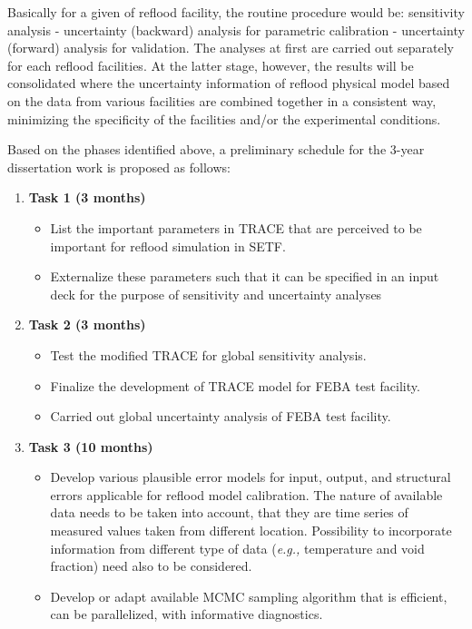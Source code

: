 \documentclass[11pt,titlepage]{article}
\begin{document}
Basically for a given of reflood facility, the routine procedure would be: sensitivity analysis - uncertainty (backward) analysis for parametric calibration - uncertainty (forward) analysis for validation. The analyses at first are carried out separately for each reflood facilities. 
At the latter stage, however, the results will be consolidated where the uncertainty information of reflood physical model based on the data from various facilities are combined together in a consistent way, minimizing the specificity of the facilities and/or the experimental conditions.

Based on the phases identified above, a preliminary schedule for the 3-year dissertation work is proposed as follows:

\begin{enumerate}
    \item \textbf{Task 1 (3 months)}
        \begin{itemize}
            \item List the important parameters in TRACE that are perceived to be important for reflood simulation in SETF.
            \item Externalize these parameters such that it can be specified in an input deck for the purpose of sensitivity and uncertainty analyses 
        \end{itemize}
    \item \textbf{Task 2 (3 months)}
        \begin{itemize}
            \item Test the modified TRACE for global sensitivity analysis.
            \item Finalize the development of TRACE model for FEBA test facility.
            \item Carried out global uncertainty analysis of FEBA test facility.
        \end{itemize}
   \item \textbf{Task 3 (10 months)}
        \begin{itemize}
            \item Develop various plausible error models for input, output, and structural errors applicable for reflood model calibration. 
            The nature of available data needs to be taken into account, that they are time series of measured values taken from different location. 
            Possibility to incorporate information from different type of data (\textit{e.g.,} temperature and void fraction) need also to be considered.   
            \item Develop or adapt available MCMC sampling algorithm that is efficient, can be parallelized, with informative diagnostics. 

\end{itemize}
\end{enumerate}
\end{document}
